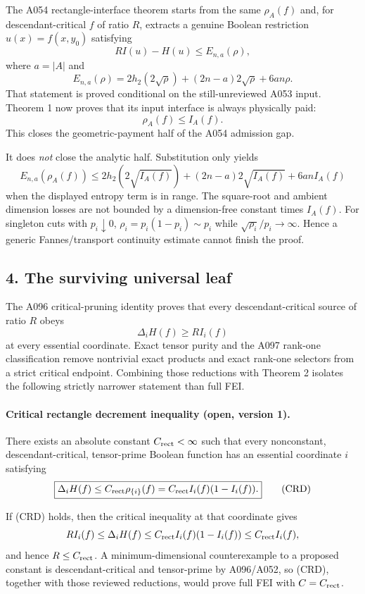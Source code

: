 The A054 rectangle-interface theorem starts from the same $\rho_A(f)$ and,
for descendant-critical $f$ of ratio $R$, extracts a genuine Boolean
restriction $u(x)=f(x,y_0)$ satisfying
\[
 R I(u)-H(u)\le E_{n,a}(\rho),
\]
where $a=|A|$ and
\[
 E_{n,a}(\rho)=2h_2(2\sqrt\rho)+(2n-a)2\sqrt\rho+6an\rho.
\]
That statement is proved conditional on the still-unreviewed A053 input.
Theorem 1 now proves that its input interface is always physically paid:
\[
 \rho_A(f)\le I_A(f).
\]
This closes the geometric-payment half of the A054 admission gap.

It does \emph{not} close the analytic half.  Substitution only yields
\[
 E_{n,a}(\rho_A(f))
 \le 2h_2(2\sqrt{I_A(f)})+(2n-a)2\sqrt{I_A(f)}+6anI_A(f)
\]
when the displayed entropy term is in range.  The square-root and ambient
dimension losses are not bounded by a dimension-free constant times
$I_A(f)$.  For singleton cuts with $p_i\downarrow0$,
$\rho_i=p_i(1-p_i)\sim p_i$ while $\sqrt{\rho_i}/p_i\to\infty$.
Hence a generic Fannes/transport continuity estimate cannot finish the proof.

\subsection*{4. The surviving universal leaf}

The A096 critical-pruning identity proves that every descendant-critical
source of ratio $R$ obeys
\[
 \Delta_iH(f)\ge R I_i(f)
\]
at every essential coordinate.  Exact tensor purity and the A097 rank-one
classification remove nontrivial exact products and exact rank-one selectors
from a strict critical endpoint.  Combining those reductions with Theorem 2
isolates the following strictly narrower statement than full FEI.

\paragraph{Critical rectangle decrement inequality (open, version 1).}
There exists an absolute constant $C_{\rm rect}<\infty$ such that every
nonconstant, descendant-critical, tensor-prime Boolean function has an
essential coordinate $i$ satisfying
\[
 \boxed{\Delta_iH(f)\le C_{\rm rect}\rho_{\{i\}}(f)
 =C_{\rm rect}I_i(f)(1-I_i(f)).}
\tag{CRD}
\]

If (CRD) holds, then the critical inequality at that coordinate gives
\[
 R I_i(f)\le\Delta_iH(f)
 \le C_{\rm rect}I_i(f)(1-I_i(f))\le C_{\rm rect}I_i(f),
\]
and hence $R\le C_{\rm rect}$.  A minimum-dimensional counterexample to a
proposed constant is descendant-critical and tensor-prime by A096/A052, so
(CRD), together with those reviewed reductions, would prove full FEI with
$C=C_{\rm rect}$.

